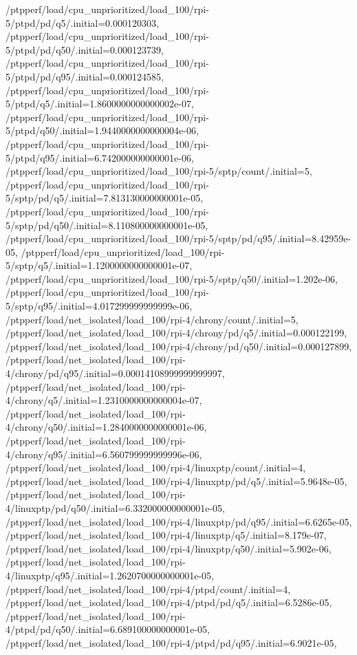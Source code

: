 {    /ptpperf/load/cpu_unprioritized/load_100/rpi-5/ptpd/pd/q5/.initial=0.000120303,
    /ptpperf/load/cpu_unprioritized/load_100/rpi-5/ptpd/pd/q50/.initial=0.000123739,
    /ptpperf/load/cpu_unprioritized/load_100/rpi-5/ptpd/pd/q95/.initial=0.000124585,
    /ptpperf/load/cpu_unprioritized/load_100/rpi-5/ptpd/q5/.initial=1.8600000000000002e-07,
    /ptpperf/load/cpu_unprioritized/load_100/rpi-5/ptpd/q50/.initial=1.9440000000000004e-06,
    /ptpperf/load/cpu_unprioritized/load_100/rpi-5/ptpd/q95/.initial=6.742000000000001e-06,
    /ptpperf/load/cpu_unprioritized/load_100/rpi-5/sptp/count/.initial=5,
    /ptpperf/load/cpu_unprioritized/load_100/rpi-5/sptp/pd/q5/.initial=7.813130000000001e-05,
    /ptpperf/load/cpu_unprioritized/load_100/rpi-5/sptp/pd/q50/.initial=8.110800000000001e-05,
    /ptpperf/load/cpu_unprioritized/load_100/rpi-5/sptp/pd/q95/.initial=8.42959e-05,
    /ptpperf/load/cpu_unprioritized/load_100/rpi-5/sptp/q5/.initial=1.1200000000000001e-07,
    /ptpperf/load/cpu_unprioritized/load_100/rpi-5/sptp/q50/.initial=1.202e-06,
    /ptpperf/load/cpu_unprioritized/load_100/rpi-5/sptp/q95/.initial=4.017299999999999e-06,
    /ptpperf/load/net_isolated/load_100/rpi-4/chrony/count/.initial=5,
    /ptpperf/load/net_isolated/load_100/rpi-4/chrony/pd/q5/.initial=0.000122199,
    /ptpperf/load/net_isolated/load_100/rpi-4/chrony/pd/q50/.initial=0.000127899,
    /ptpperf/load/net_isolated/load_100/rpi-4/chrony/pd/q95/.initial=0.00014108999999999997,
    /ptpperf/load/net_isolated/load_100/rpi-4/chrony/q5/.initial=1.2310000000000004e-07,
    /ptpperf/load/net_isolated/load_100/rpi-4/chrony/q50/.initial=1.2840000000000001e-06,
    /ptpperf/load/net_isolated/load_100/rpi-4/chrony/q95/.initial=6.560799999999996e-06,
    /ptpperf/load/net_isolated/load_100/rpi-4/linuxptp/count/.initial=4,
    /ptpperf/load/net_isolated/load_100/rpi-4/linuxptp/pd/q5/.initial=5.9648e-05,
    /ptpperf/load/net_isolated/load_100/rpi-4/linuxptp/pd/q50/.initial=6.332000000000001e-05,
    /ptpperf/load/net_isolated/load_100/rpi-4/linuxptp/pd/q95/.initial=6.6265e-05,
    /ptpperf/load/net_isolated/load_100/rpi-4/linuxptp/q5/.initial=8.179e-07,
    /ptpperf/load/net_isolated/load_100/rpi-4/linuxptp/q50/.initial=5.902e-06,
    /ptpperf/load/net_isolated/load_100/rpi-4/linuxptp/q95/.initial=1.2620700000000001e-05,
    /ptpperf/load/net_isolated/load_100/rpi-4/ptpd/count/.initial=4,
    /ptpperf/load/net_isolated/load_100/rpi-4/ptpd/pd/q5/.initial=6.5286e-05,
    /ptpperf/load/net_isolated/load_100/rpi-4/ptpd/pd/q50/.initial=6.689100000000001e-05,
    /ptpperf/load/net_isolated/load_100/rpi-4/ptpd/pd/q95/.initial=6.9021e-05,
}
